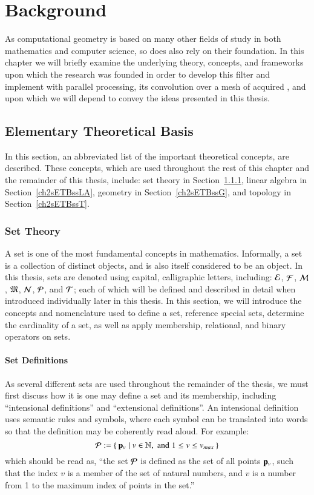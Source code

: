\chapter{Background}
\label{ch2}
As computational geometry is based on many other fields of study in both mathematics and computer science, so does  also rely on their foundation. In this chapter we will briefly examine the underlying theory, concepts, and frameworks upon which the research was founded in order to develop this filter and implement with parallel processing, its convolution over a mesh of acquired \tdd{}, and upon which we will depend to convey the ideas presented in this thesis.

%
%
%
%
%
%
\section{Elementary Theoretical Basis}
\label{ch2sETB}
In this section, an abbreviated list of the important theoretical concepts, are described. These concepts, which are used throughout the rest of this chapter and the remainder of this thesis, include: set theory in Section~\ref{ch2sETBssST}, linear algebra in Section~\ref{ch2sETBssLA}, geometry in Section~\ref{ch2sETBssG}, and topology in Section~\ref{ch2sETBssT}.

%
%
%
%
\subsection{Set Theory}
\label{ch2sETBssST}
A set is one of the most fundamental concepts in mathematics. Informally, a set is a collection of distinct objects, and is also itself considered to be an object. In this thesis, sets are denoted using capital, calligraphic letters, including: $\mathcal{E}$, $\mathcal{F}$, $\mathcal{M}$, $\mathfrak{M}$, $\mathcal{N}$, $\mathcal{P}$, and $\mathcal{T}$; each of which will be defined and described in detail when introduced individually later in this thesis. In this section, we will introduce the concepts and nomenclature used to define a set, reference special sets, determine the cardinality of a set, as well as apply membership, relational, and binary operators on sets.

%
%
\subsubsection{Set Definitions}
\label{ch2sETBssSTsssSD}
As several different sets are used throughout the remainder of the thesis, we must first discuss how it is one may define a set and its membership, including ``intensional definitions'' and ``extensional definitions''. An intensional definition uses semantic rules and symbols, where each symbol can be translated into words so that the definition may be coherently read aloud. For example:
%
\begin{equation}
	\mathcal{P} := \left \{\:\mathbf{p}_v \mid v \in \mathbb{N}, \;\text{and}\; 1\leq v \leq v_{max}\:\right \}
\end{equation}
%
which should be read as, ``the set $\mathcal{P}$ is defined as the set of all points $\mathbf{p}_v$, such that the index $v$ is a member of the set of natural numbers, and $v$ is a number from 1 to the maximum index of points in the set.''

